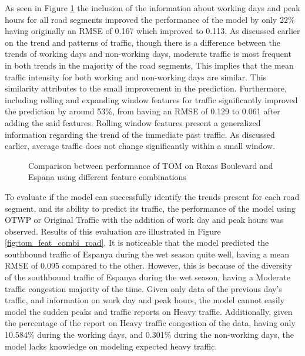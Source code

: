 As seen in Figure \ref{fig:tom_diff_feat_combi} the inclusion of the information about working days and peak hours for all road segments improved the performance of the model by only 22\% having originally an RMSE of 0.167 which improved to 0.113. As discussed earlier on the trend and patterns of traffic, though there is a difference between the trends of working days and non-working days, moderate traffic is most frequent in both trends in the majority of the road segments, This implies that the mean traffic intensity for both working and non-working days are similar. This similarity attributes to the small improvement in the prediction. Furthermore, including rolling and expanding window features for traffic significantly improved the prediction by around 53\%, from having an RMSE of 0.129 to 0.061 after adding the said features. Rolling window features present a generalized information regarding the trend of the immediate past traffic. As discussed earlier, average traffic does not change significantly within a small window.   

\begin{figure}
  \centering
  \captionsetup{justification=centering}
  \caption{Comparison between performance of TOM on Roxas Boulevard and Espana using different feature combinations}
  \label{fig:tom_diff_feat_combi}
\end{figure}


To evaluate if the model can successfully identify the trends present for each road segment, and its ability to predict its traffic, the performance of the model using OTWP or Original Traffic with the addition of work day and peak hours was observed. Results of this evaluation are illustrated in Figure \ref{fig:tom_feat_combi_road}. It is noticeable that the model predicted the southbound traffic of Espanya during the wet season quite well, having a mean RMSE of 0.095 compared to the other. However, this is because of the diversity of the southbound traffic of Espanya during the wet season, having a Moderate traffic congestion majority of the time. Given only data of the previous day’s traffic, and information on work day and peak hours, the model cannot easily model the sudden peaks and traffic reports on Heavy traffic. Additionally, given the percentage of the report on Heavy traffic congestion of the data, having only 10.584\% during the working days, and 0.301\% during the non-working days, the model lacks knowledge on modeling expected heavy traffic. 

